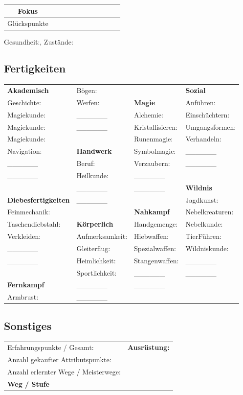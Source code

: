 \documentclass{article}
\begin{document}
\medskip
\newline\hline
\medskip
\begin{tabular}{| c | c | c | c | c | c | c | c | c | c | c |}
\hline
Fokus&&&&&&&&&&\\
\hline
Glückspunkte&&&&&&&&&&\\
\hline
\end{tabular}
\newline

Gesundheit:\space\space\space\space\space, Zustände:
\newline\hline
\begin{center}
\subsection{Fertigkeiten}
\end{center}
\begin{tabular}{ m{4cm}  m{4cm}  m{4cm}  m{4cm} }
\textbf{Akademisch}&Bögen:&&\textbf{Sozial}\\
Geschichte:&Werfen:&\textbf{Magie}&Anführen:\\
Magiekunde:&\_\_\_\_\_\_&Alchemie:&Einschüchtern:\\
Magiekunde:&\_\_\_\_\_\_&Kristallisieren:&Umgangsformen:\\
Magiekunde:&&Runenmagie:&Verhandeln:\\
Navigation:&\textbf{Handwerk}&Symbolmagie:&\_\_\_\_\_\_\\
\_\_\_\_\_\_&Beruf:&Verzaubern:&\_\_\_\_\_\_\\
\_\_\_\_\_\_&Heilkunde:&\_\_\_\_\_\_&\\
&\_\_\_\_\_\_&\_\_\_\_\_\_&\textbf{Wildnis}\\
\textbf{Diebesfertigkeiten}&\_\_\_\_\_\_&&Jagdkunst:\\
Feinmechanik:&&\textbf{Nahkampf}&Nebelkreaturen:\\
Taschendiebstahl:&\textbf{Körperlich}&Handgemenge:&Nebelkunde:\\
Verkleiden:&Aufmerksamkeit:&Hiebwaffen:&TierFühren:\\
\_\_\_\_\_\_&Gleiterflug:&Spezialwaffen:&Wildniskunde:\\
\_\_\_\_\_\_&Heimlichkeit:&Stangenwaffen:&\_\_\_\_\_\_\\
&Sportlichkeit:&\_\_\_\_\_\_&\_\_\_\_\_\_\\
\textbf{Fernkampf}&\_\_\_\_\_\_&\_\_\_\_\_\_&\\
Armbrust:&\_\_\_\_\_\_&&\\
\end{tabular}

\newline\hline
\begin{center}
\subsection{Sonstiges}
\end{center}
\begin{tabular}{ m{10cm} m{10cm}}
Erfahrungspunkte / Gesamt:&\textbf{Ausrüstung:}\\
Anzahl gekaufter Attributspunkte:&\\
Anzahl erlernter Wege / Meisterwege:&\\
\textbf{Weg / Stufe}&\\
\end{tabular}
\end{document}
